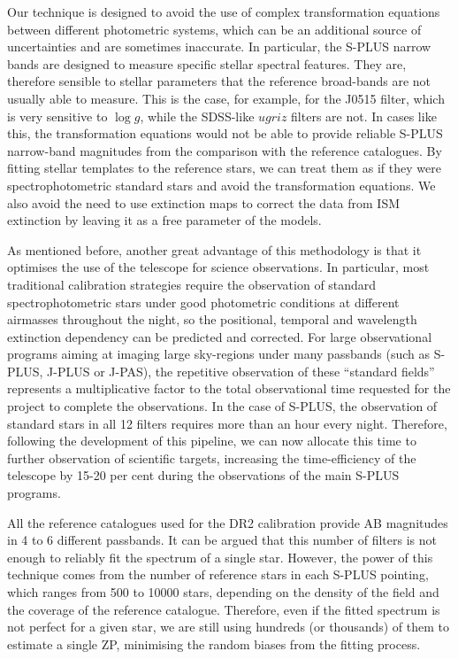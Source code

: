 \documentclass[fleqn,usenatbib]{mnras}
\begin{document}
Our technique is designed to avoid the use of complex transformation equations between different photometric systems, which can be an additional source of uncertainties and are sometimes inaccurate. In particular, the S-PLUS narrow bands are designed to measure specific stellar spectral features. They are, therefore sensible to stellar parameters that the reference broad-bands are not usually able to measure. This is the case, for example, for the J0515 filter, which is very sensitive to $\log g$, while the SDSS-like $ugriz$ filters are not. In cases like this, the transformation equations would not be able to provide reliable S-PLUS narrow-band magnitudes from the comparison with the reference catalogues. By fitting stellar templates to the reference stars, we can treat them as if they were spectrophotometric standard stars and avoid the transformation equations. We also avoid the need to use extinction maps to correct the data from ISM extinction by leaving it as a free parameter of the models.

As mentioned before, another great advantage of this methodology is that it optimises the use of the telescope for science observations. In particular, most traditional calibration strategies require the observation of standard spectrophotometric stars under good photometric conditions at different airmasses throughout the night, so the positional, temporal and wavelength extinction dependency can be predicted and corrected. For large observational programs aiming at imaging large sky-regions under many passbands (such as S-PLUS, J-PLUS or J-PAS), the repetitive observation of these “standard fields” represents a multiplicative factor to the total observational time requested for the project to complete the observations. In the case of S-PLUS, the observation of standard stars in all 12 filters requires more than an hour every night. Therefore, following the development of this pipeline, we can now allocate this time to further observation of scientific targets, increasing the time-efficiency of the telescope by 15-20 per cent during the observations of the main S-PLUS programs.

All the reference catalogues used for the DR2 calibration provide AB magnitudes in 4 to 6 different passbands. It can be argued that this number of filters is not enough to reliably fit the spectrum of a single star. However, the power of this technique comes from the number of reference stars in each S-PLUS pointing, which ranges from 500 to 10000 stars, depending on the density of the field and the coverage of the reference catalogue. Therefore, even if the fitted spectrum is not perfect for a given star, we are still using hundreds (or thousands) of them to estimate a single ZP, minimising the random biases from the fitting process. 
\end{document}
